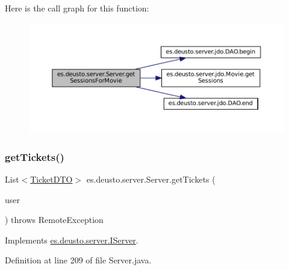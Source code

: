 Here is the call graph for this function\+:
\nopagebreak
\begin{figure}[H]
\begin{center}
\leavevmode
\includegraphics[width=350pt]{classes_1_1deusto_1_1server_1_1_server_a33a6671bb4dc4bd9e23df10e53e5632d_cgraph}
\end{center}
\end{figure}
\mbox{\label{classes_1_1deusto_1_1server_1_1_server_ac46819596621f54e4c083d7ea49e3ff0}} 
\subsubsection{\texorpdfstring{getTickets()}{getTickets()}}
{\footnotesize\ttfamily List$<$\mbox{\hyperlink{classes_1_1deusto_1_1server_1_1data_1_1_ticket_d_t_o}{Ticket\+D\+TO}}$>$ es.\+deusto.\+server.\+Server.\+get\+Tickets (\begin{DoxyParamCaption}\item[{\mbox{\hyperlink{classes_1_1deusto_1_1server_1_1data_1_1_user_d_t_o}{User\+D\+TO}}}]{user }\end{DoxyParamCaption}) throws Remote\+Exception}



Implements \mbox{\hyperlink{interfacees_1_1deusto_1_1server_1_1_i_server_ab782fc42997e35e5288e2b38a718b5c7}{es.\+deusto.\+server.\+I\+Server}}.



Definition at line 209 of file Server.\+java.

